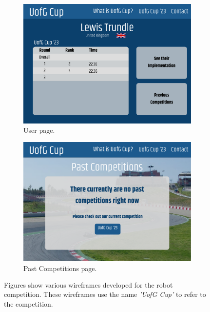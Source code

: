 \documentclass{l4proj}
\begin{document}
\begin{appendices}
\begin{figure}
    \begin{subfigure}{0.49\textwidth}
        \centering
        \includegraphics[width=\textwidth]{images/User.pdf}
        \caption{User page.}
        \label{fig:web-user-page}  
    \end{subfigure}
    \begin{subfigure}{0.49\textwidth}
        \centering
        \includegraphics[width=\textwidth]{images/Past Competitions.pdf}
        \caption{Past Competitions page.}
        \label{fig:web-past-page}  
    \end{subfigure}
    
    \caption{Figures show various wireframes developed for the robot competition. These wireframes use the name \textit{'UofG Cup'} to refer to the competition.}
    \label{fig:website-wireframes}
\end{figure}




\end{appendices}
\end{document}
